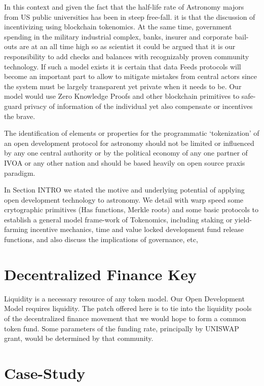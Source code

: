 \documentclass[final,5p,times,twocolumn,authoryear]{elsarticle}
\begin{document}
In this context and given the fact that the half-life rate of Astronomy majors from US public universities has been in steep free-fall.  \cite{milo_2018} it is that the discussion of incentivizing using blockchain tokenomics. At the same time, government spending in the military industrial complex, banks, insurer and corporate bail-outs are at an all time high so as scientist it could be argued that it is our responsibility to add checks and balances with recognizably proven community technology. 
%
If such a model exists it is certain that data Feeds protocols will become an important part to allow to mitigate mistakes from central actors since the system must be largely transparent yet private when it needs to be. Our model would use Zero Knowledge Proofs and other blockchain primitives to safe-guard privacy of information of the individual yet also compensate or incentives the brave. 
   
The identification of elements or properties for the programmatic `tokenization' of an open development protocol for astronomy should not be limited or influenced by any one central authority or by the political economy of any one partner of IVOA or any other nation and should be based heavily on open source praxis paradigm. 
   
In Section INTRO we stated the motive and underlying potential of applying open development technology to astronomy. We detail with warp speed some crytographic primitives (Has functions, Merkle roots) and some basic protocols to establish a general model frame-work of Tokenomics, including staking or yield-farming incentive mechanics, time and value locked development fund release functions, and also discuss the implications of governance, etc,

\section{Decentralized Finance Key}

Liquidity is a necessary resource of any token model. Our Open Development Model requires liquidity. The patch offered here is to tie into the liquidity pools of the decentralized finance movement that we would hope to form a common token fund. Some parameters of the funding rate, principally by UNISWAP grant, would be determined by that community.   

\section{Case-Study}
\label{sec:btc5}
\end{document}

